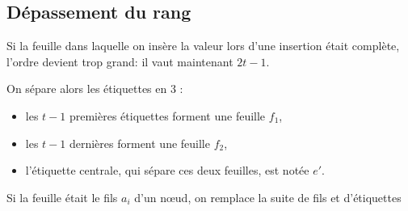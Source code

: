 \subsection{Dépassement du rang}
Si la feuille dans laquelle on insère la valeur lors d'une insertion était complète, l'ordre devient trop grand: il vaut maintenant $2t-1$. 

On sépare alors les étiquettes en 3 :

\begin{itemize}
    \item les $t-1$ premières étiquettes forment une feuille $f_1$,
    \item les $t-1$ dernières  forment une feuille $f_2$,
    \item l'étiquette centrale, qui sépare ces deux feuilles, est notée $e'$.
\end{itemize}

Si la feuille était le fils $a_i$ d'un nœud,  on remplace la suite de fils et d'étiquettes 

